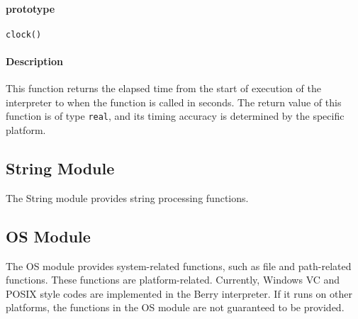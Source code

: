 
\paragraph{prototype}
\begin{lstlisting}[language=berry, numbers=none]
clock()
\end{lstlisting}

\paragraph{Description}

This function returns the elapsed time from the start of execution of the interpreter to when the function is called in seconds. The return value of this function is of type \texttt{real}, and its timing accuracy is determined by the specific platform.

\subsection{String Module}

The String module provides string processing functions.

\subsection{OS Module}

The OS module provides system-related functions, such as file and path-related functions. These functions are platform-related. Currently, Windows VC and POSIX style codes are implemented in the Berry interpreter. If it runs on other platforms, the functions in the OS module are not guaranteed to be provided.